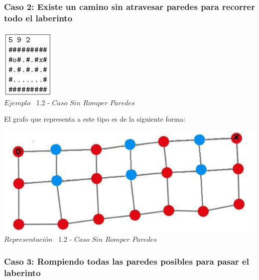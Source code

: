  \begin{center}
 \subsubsection*{Caso 2: Existe un camino sin atravesar paredes para recorrer todo el laberinto}
\end{center}
 
\vspace*{0.3cm} \vspace*{0.3cm}
  \begin{center}
 \includegraphics[scale=1.6]{./EJ1/ej1solucionsinpared.jpeg}
 \\{$Ejemplo$ \ 1.2 - $Caso$ $Sin$ $Romper$ $Paredes$}
  \end{center}
  \vspace*{0.3cm}

El grafo que representa a este tipo es de la siguiente forma:\\

\vspace*{0.3cm} \vspace*{0.3cm}
  \begin{center}
 \includegraphics[scale=0.5]{./EJ1/ej1grafosolucionsinpared.jpeg}
 \\{$Representación$ \ 1.2 - $Caso$ $Sin$ $Romper$ $Paredes$}
  \end{center}
  \vspace*{0.3cm}

  
\begin{center}
 \subsubsection*{Caso 3: Rompiendo todas las paredes posibles para pasar el laberinto}
\end{center}
 
